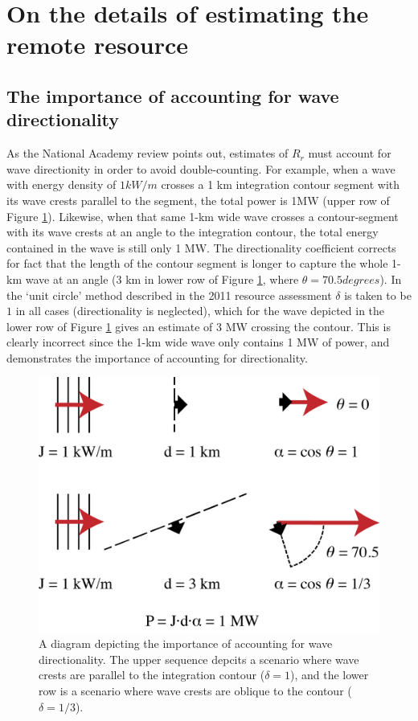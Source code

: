 \section{On the details of estimating the remote resource} \label{appendix:delta}

\subsection{The importance of accounting for wave directionality} \label{appendix:directionality}


As the National Academy review points out, estimates of $R_r$ must account for wave directionity in order to avoid double-counting. For example, when a wave with energy density of $1 \unit{kW/m}$ crosses a 1 km integration contour segment with its wave crests parallel to the segment, the total power is 1MW (upper row of Figure \ref{fig:directionality}). Likewise, when that same 1-km wide wave crosses a contour-segment with its wave crests at an angle to the integration contour, the total energy contained in the wave is still only 1 MW. The directionality coefficient corrects for fact that the length of the contour segment is longer to capture the whole 1-km wave at an angle (3 km in lower row of Figure \ref{fig:directionality}, where $\theta = 70.5 \unit{degrees}$). In the `unit circle' method described in the 2011 resource assessment $\delta$ is taken to be $1$ in all cases (directionality is neglected), which for the wave depicted in the lower row of Figure \ref{fig:directionality} gives an estimate of 3 MW crossing the contour. This is clearly incorrect since the 1-km wide wave only contains 1 MW of power, and demonstrates the importance of accounting for directionality.

\begin{figure}[ht]
    \centering
    \includegraphics[width=0.6 \linewidth]{../diagram/Dot-Product_Schematic01.png}
    \caption{A diagram depicting the importance of accounting for wave directionality. The upper sequence depcits a scenario where wave crests are parallel to the integration contour ($\delta = 1$), and the lower row is a scenario where wave crests are oblique to the contour ($\delta = 1/3$). }
    \label{fig:directionality}
\end{figure}

